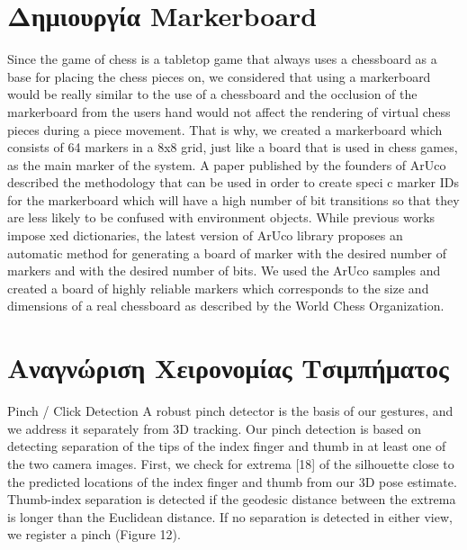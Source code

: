 \section{Δημιουργία Markerboard}


Since the game of chess is a tabletop game that always uses a chessboard as a base for placing the chess pieces on, we considered that using a markerboard would be really similar to the use of a chessboard and the occlusion of the markerboard from the users hand would not affect the rendering of virtual chess pieces during a piece movement. That is why, we created a markerboard which consists of 64 markers in a 8x8 grid, just like a board that is used in chess games, as the main marker of the system. A paper published by the founders of ArUco described the methodology that can be used in order to create speci c marker IDs for the markerboard which will have a high number of bit transitions so that they are less likely to be confused with environment objects. While previous works impose xed dictionaries, the latest version of ArUco library proposes an automatic method for generating a board of marker with the desired number of markers and with the desired number of bits. We used the ArUco samples and created a board of highly reliable markers which corresponds to the size and dimensions of a real chessboard as described by the World Chess Organization.



\section{Αναγνώριση Χειρονομίας Τσιμπήματος}

Pinch / Click Detection A robust pinch detector is the basis
of our gestures, and we address it separately from 3D tracking.
Our pinch detection is based on detecting separation of
the tips of the index finger and thumb in at least one of the
two camera images. First, we check for extrema [18] of the
silhouette close to the predicted locations of the index finger
and thumb from our 3D pose estimate. Thumb-index separation
is detected if the geodesic distance between the extrema
is longer than the Euclidean distance. If no separation is detected
in either view, we register a pinch (Figure 12).



